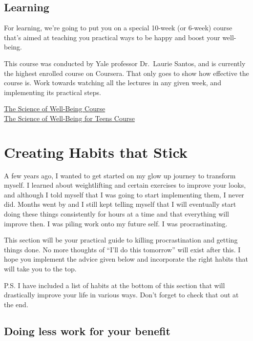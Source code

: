 \documentclass[
]{book}
\begin{document}
\hypertarget{learning}{%
\section{Learning}\label{learning}}

For learning, we're going to put you on a special 10-week (or 6-week) course that's aimed at teaching you practical ways to be happy and boost your well-being.

This course was conducted by Yale professor Dr.~Laurie Santos, and is currently the highest enrolled course on Coursera. That only goes to show how effective the course is. Work towards watching all the lectures in any given week, and implementing its practical steps.

\href{https://www.coursera.org/learn/the-science-of-well-being/home/week/1}{The Science of Well-Being Course}\\
\href{https://www.coursera.org/learn/the-science-of-well-being-for-teens/home/week/1}{The Science of Well-Being for Teens Course}

\hypertarget{creating-habits-that-stick}{%
\chapter{Creating Habits that Stick}\label{creating-habits-that-stick}}

A few years ago, I wanted to get started on my glow up journey to transform myself. I learned about weightlifting and certain exercises to improve your looks, and although I told myself that I was going to start implementing them, I never did. Months went by and I still kept telling myself that I will eventually start doing these things consistently for hours at a time and that everything will improve then. I was piling work onto my future self. I was procrastinating.

This section will be your practical guide to killing procrastination and getting things done. No more thoughts of ``I'll do this tomorrow'' will exist after this. I hope you implement the advice given below and incorporate the right habits that will take you to the top.

P.S. I have included a list of habits at the bottom of this section that will drastically improve your life in various ways. Don't forget to check that out at the end.

\hypertarget{doing-less-work-for-your-benefit}{%
\section{Doing less work for your benefit}\label{doing-less-work-for-your-benefit}}
\end{document}
